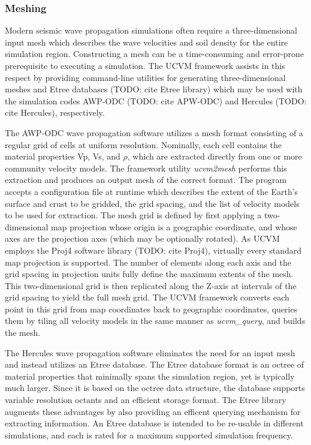 \subsubsection{Meshing}
Modern seismic wave propagation simulations often require a three-dimensional input mesh which describes the wave velocities and soil density for the entire simulation region. Constructing a mesh can be a time-consuming and error-prone prerequisite to executing a simulation. The UCVM framework assists in this respect by providing command-line utilities for generating three-dimensional meshes and Etree databases (TODO: cite Etree library) which may be used with the simulation codes AWP-ODC (TODO: cite APW-ODC) and Hercules (TODO: cite Hercules), respectively.

The AWP-ODC wave propagation software utilizes a mesh format consisting of a regular grid of cells at uniform resolution. Nominally, each cell contains the material properties Vp, Vs, and $\rho$, which are extracted directly from one or more community velocity models. The framework utility \emph{ucvm2mesh} performs this extraction and produces an output mesh of the correct format. The program accepts a configuration file at runtime which describes the extent of the Earth's surface and crust to be gridded, the grid spacing, and the list of velocity models to be used for extraction. The mesh grid is defined by first applying a two-dimensional map projection whose origin is a geographic coordinate, and whose axes are the projection axes (which may be optionally rotated). As UCVM employs the Proj4 software library (TODO: cite Proj4), virtually every standard map projection is supported. The number of elements along each axis and the grid spacing in projection units fully define the maximum extents of the mesh. This two-dimensional grid is then replicated along the Z-axis at intervals of the grid spacing to yield the full mesh grid. The UCVM framework converts each point in this grid from map coordinates back to geographic coordinates, queries them by tiling all velocity models in the same manner as \emph{ucvm\_query}, and builds the mesh.

The Hercules wave propagation software eliminates the need for an input mesh and instead utilizes an Etree database. The Etree database format is an octree of material properties that minimally spans the simulation region, yet is typically much larger. Since it is based on the octree data structure, the database supports variable resolution octants and an efficient storage format. The Etree library augments these advantages by also providing an efficent querying mechanism for extracting information. An Etree database is intended to be re-usable in different simulations, and each is rated for a maximum supported simulation frequency. 

